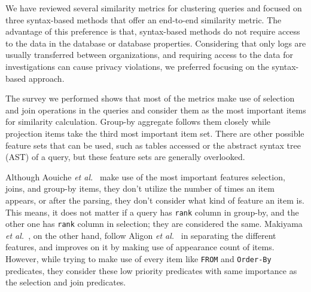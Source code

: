 We have reviewed several similarity metrics for clustering queries and focused on three syntax-based methods that offer an end-to-end similarity metric. The advantage of this preference is that, syntax-based methods do not require access to the data in the database or database properties. Considering that only logs are usually transferred between organizations, and requiring access to the data for investigations can cause privacy violations, we preferred focusing on the syntax-based approach.

The survey we performed shows that most of the metrics make use of selection and join operations in the queries and consider them as the most important items for similarity calculation. Group-by aggregate follows them closely while projection items take the third most important item set. There are other possible feature sets that can be used, such as tables accessed or the abstract syntax tree (AST) of a query, but these feature sets are generally overlooked.


Although Aouiche \textit{et al.}~\cite{aouiche2006}
make use of the most important features selection, joins, and group-by items, they don't utilize the number of times an item appears, or after the parsing, they don't consider what kind of feature an item is. This means, it does not matter if a query has \texttt{rank} column in group-by, and the other one has \texttt{rank} column in selection; they are considered the same. Makiyama \textit{et al.}~\cite{makiyama2015text}, on the other hand, follow Aligon \textit{et al.}~\cite{aligon2014similarity} in separating the different features, and improves on it by making use of appearance count of items. However, while trying to make use of every item like \texttt{FROM} and \texttt{Order-By} predicates, they consider these low priority predicates with same importance as the selection and join predicates.


